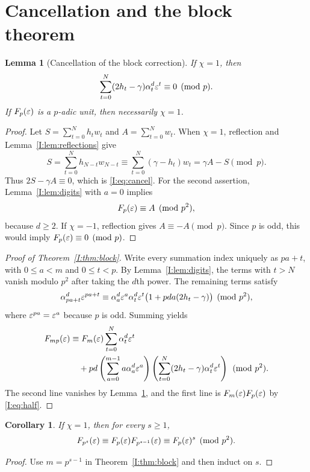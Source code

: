 \documentclass[11pt,letterpaper]{article}
\newtheorem{corollary}[theorem]{Corollary}
\newtheorem{lemma}[theorem]{Lemma}
\theoremstyle{definition}
\theoremstyle{remark}
\begin{document}
\section{Cancellation and the block theorem}

\begin{lemma}[Cancellation of the block correction]\label{I:lem:cancel}
If $\chi=1$, then
\begin{equation}\label{I:eq:cancel}
 \sum_{t=0}^N(2h_t-\gamma)\alpha_t^d\varepsilon^t\equiv0\pmod p.
\end{equation}
If $F_p(\varepsilon)$ is a $p$-adic unit, then necessarily $\chi=1$.
\end{lemma}
\begin{proof}
Let $S=\sum_{t=0}^Nh_tw_t$ and $A=\sum_{t=0}^Nw_t$.
When $\chi=1$, reflection and Lemma~\ref{I:lem:reflections} give
\[
 S=\sum_{t=0}^Nh_{N-t}w_{N-t}
   \equiv\sum_{t=0}^N(\gamma-h_t)w_t
   =\gamma A-S\pmod p.
\]
Thus $2S-\gamma A\equiv0$, which is \eqref{I:eq:cancel}.
For the second assertion, Lemma~\ref{I:lem:digits} with $a=0$ implies
\begin{equation}\label{I:eq:half}
 F_p(\varepsilon)\equiv A\pmod{p^2},
\end{equation}
because $d\ge2$.  If $\chi=-1$, reflection gives $A\equiv-A\pmod p$.
Since $p$ is odd, this would imply $F_p(\varepsilon)\equiv0\pmod p$.
\end{proof}

\begin{proof}[Proof of Theorem~\ref{I:thm:block}]
Write every summation index uniquely as $pa+t$, with $0\le a<m$ and
$0\le t<p$.  By Lemma~\ref{I:lem:digits}, the terms with $t>N$ vanish
modulo $p^2$ after taking the $d$th power.  The remaining terms satisfy
\[
 \alpha_{pa+t}^d\varepsilon^{pa+t}
 \equiv\alpha_a^d\varepsilon^a\alpha_t^d\varepsilon^t
       \bigl(1+pda(2h_t-\gamma)\bigr)\pmod{p^2},
\]
where $\varepsilon^{pa}=\varepsilon^a$ because $p$ is odd.  Summing yields
\begin{align*}
 F_{mp}(\varepsilon)
 &\equiv F_m(\varepsilon)\sum_{t=0}^N\alpha_t^d\varepsilon^t\\
 &\quad+pd\left(\sum_{a=0}^{m-1}a\alpha_a^d\varepsilon^a\right)
          \left(\sum_{t=0}^N(2h_t-\gamma)\alpha_t^d\varepsilon^t\right)
          \pmod{p^2}.
\end{align*}
The second line vanishes by Lemma~\ref{I:lem:cancel}, and the first
line is $F_m(\varepsilon)F_p(\varepsilon)$ by \eqref{I:eq:half}.
\end{proof}

\begin{corollary}\label{I:cor:levels}
If $\chi=1$, then for every $s\ge1$,
\[
 F_{p^s}(\varepsilon)\equiv F_p(\varepsilon)F_{p^{s-1}}(\varepsilon)
              \equiv F_p(\varepsilon)^s\pmod{p^2}.
\]
\end{corollary}
\begin{proof}
Use $m=p^{s-1}$ in Theorem~\ref{I:thm:block} and then induct on $s$.
\end{proof}
\end{document}

